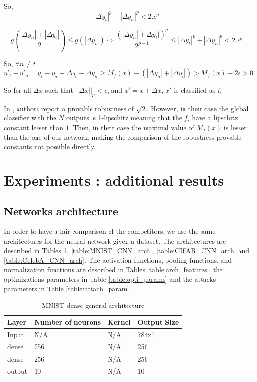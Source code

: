 So,
\[
|\Delta y_t|^p+|\Delta y_n|^p< 2.\epsilon^p
\]


\begin{equation*}
g(\frac{|\Delta y_n|+|\Delta y_t|}{2})\leq g(|\Delta y_t|) \iff  \frac{(|\Delta y_n| + \Delta y_t|)^p}{2^{p-1}} \leq|\Delta y_t|^p+|\Delta y_n|^p < 2.\epsilon^p
\end{equation*}


So, $\forall n\neq t$
\begin{equation*}
y'_t - y'_n = y_t -y_n + \Delta y_t - \Delta y_n \geq M_f(x) - (|\Delta y_n|+|\Delta y_t|) > M_f(x) - 2\epsilon > 0
\end{equation*}

So for all $\Delta x$ such that $||\Delta x||_p<\epsilon$, and $x'=x+\Delta x$, $x'$ is  classified as $t$.


In \cite{li2019preventing}, authors report a provable robustness of $\sqrt{2}$. However, in their case the global classifier with the $N$ outputs is 1-lipschitz meaning that the $f_i$ have a lipschitz constant lesser than $1$. Then, in their case the maximal value of $M_f(x)$ is lesser than the one of our network, making the comparison of the robustness provable constants not possible directly. 

\section{Experiments : additional results}
\subsection{Networks architecture}
In order to have a fair comparison of the competitors, we use the same architectures for the neural network given a dataset. The architectures are described in Tables \ref{table:MNIST_dense_arch}, \ref{table:MNIST_CNN_arch}, \ref{table:CIFAR_CNN_arch}  and \ref{table:CelebA_CNN_arch}. The activation functions, pooling functions, and normalization functions are described in Tables \ref{table:arch_features}, the optimizations parameters in Table \ref{table:opti_params} and the attacks parameters in Table \ref{table:attach_param}.
\label{sec:networks_architecture}


\begin{table}[]
\centering
\begin{tabular}{|l|l|l|l|}
\hline
Layer   & Number of neurons & Kernel & Output Size \\ \hline
Input   &       N/A            &   N/A     &   784x1          \\ \hline
dense   &       256            &    N/A     &     256        \\ \hline
dense   &       256            &    N/A     &     256        \\ \hline
output   &       10            &    N/A     &     10        \\ \hline
\end{tabular}
\caption{MNIST dense general architecture}
\label{table:MNIST_dense_arch}
\end{table}

